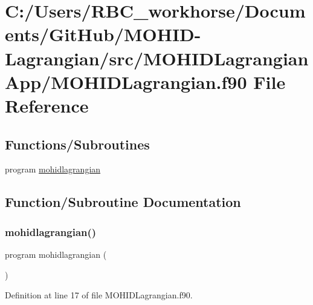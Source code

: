 \hypertarget{_m_o_h_i_d_lagrangian_8f90}{}\section{C\+:/\+Users/\+R\+B\+C\+\_\+workhorse/\+Documents/\+Git\+Hub/\+M\+O\+H\+I\+D-\/\+Lagrangian/src/\+M\+O\+H\+I\+D\+Lagrangian\+App/\+M\+O\+H\+I\+D\+Lagrangian.f90 File Reference}
\label{_m_o_h_i_d_lagrangian_8f90}
\subsection*{Functions/\+Subroutines}
\begin{DoxyCompactItemize}
\item 
program \mbox{\hyperlink{_m_o_h_i_d_lagrangian_8f90_afb8cd544871a8dba29f3eac2f03477d2}{mohidlagrangian}}
\end{DoxyCompactItemize}


\subsection{Function/\+Subroutine Documentation}
\mbox{\label{_m_o_h_i_d_lagrangian_8f90_afb8cd544871a8dba29f3eac2f03477d2}} 
\subsubsection{\texorpdfstring{mohidlagrangian()}{mohidlagrangian()}}
{\footnotesize\ttfamily program mohidlagrangian (\begin{DoxyParamCaption}{ }\end{DoxyParamCaption})}



Definition at line 17 of file M\+O\+H\+I\+D\+Lagrangian.\+f90.

